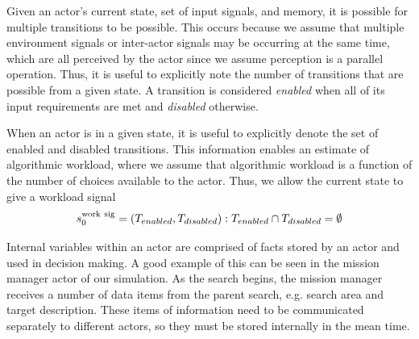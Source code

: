 Given an actor's current state, set of input signals, and memory, it is possible for multiple transitions to be possible.  This occurs because we assume that multiple environment signals or inter-actor signals may be occurring at the same time, which are all perceived by the actor since we assume perception is a parallel operation.  Thus, it is useful to explicitly note the number of transitions that are possible from a given state.   A transition is considered {\em enabled} when all of its input
requirements are met and {\em disabled} otherwise. 

When an actor is in a given state, it is useful to explicitly denote the set of enabled and disabled transitions.  This information enables an estimate of algorithmic workload, where we assume that algorithmic workload is a function of the number of choices available to the actor.  Thus, we allow the current state to give a workload signal
\begin{equation}
	s_0^{\rm work\  sig} = (T_{enabled}, T_{disabled}) : T_{enabled} \cap T_{disabled} = \emptyset
 \label{eq:state}
\end{equation}

Internal variables within an actor are comprised of facts stored by an actor and used in decision making.
A good example of this can be seen in the mission manager actor of our simulation. As the search begins, the mission manager receives a number of data items from the parent search, e.g. search area and target description. These items of information need to be communicated separately to different actors, so they must be stored internally in the mean time. 
